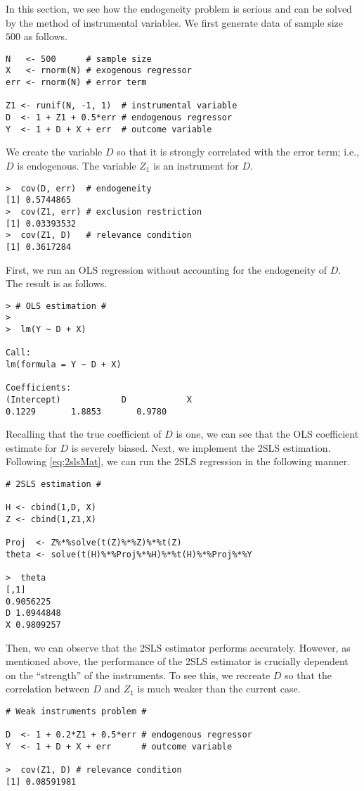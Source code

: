 \documentclass[11pt, A4paper, openany, uplatex]{book}
\begin{document}
In this section, we see how the endogeneity problem is serious and can be solved by the method of instrumental variables.
We first generate data of sample size $500$ as follows.
\begin{lstlisting}[basicstyle=\ttfamily\footnotesize, frame=single]
N   <- 500      # sample size
X   <- rnorm(N) # exogenous regressor
err <- rnorm(N) # error term

Z1 <- runif(N, -1, 1)  # instrumental variable
D  <- 1 + Z1 + 0.5*err # endogenous regressor
Y  <- 1 + D + X + err  # outcome variable
\end{lstlisting}
We create the variable $D$ so that it is strongly correlated with the error term; i.e., $D$ is endogenous.
The variable $Z_1$ is an instrument for $D$.
\begin{lstlisting}[basicstyle=\ttfamily\footnotesize, frame=single]
>  cov(D, err)  # endogeneity
[1] 0.5744865
>  cov(Z1, err) # exclusion restriction
[1] 0.03393532
>  cov(Z1, D)   # relevance condition
[1] 0.3617284
\end{lstlisting}
First, we run an OLS regression without accounting for the endogeneity of $D$.
The result is as follows.
\begin{lstlisting}[basicstyle=\ttfamily\footnotesize, frame=single]
> # OLS estimation #
> 
>  lm(Y ~ D + X)

Call:
lm(formula = Y ~ D + X)

Coefficients:
(Intercept)            D            X  
0.1229       1.8853       0.9780  
\end{lstlisting}
Recalling that the true coefficient of $D$ is one, we can see that the OLS coefficient estimate for $D$ is severely biased.
Next, we implement the 2SLS estimation.
Following \eqref{eq:2slsMat}, we can run the 2SLS regression in the following manner. 
\begin{lstlisting}[basicstyle=\ttfamily\footnotesize, frame=single]
# 2SLS estimation #

H <- cbind(1,D, X)
Z <- cbind(1,Z1,X)

Proj  <- Z%*%solve(t(Z)%*%Z)%*%t(Z)
theta <- solve(t(H)%*%Proj%*%H)%*%t(H)%*%Proj%*%Y

>  theta
[,1]
0.9056225
D 1.0944848
X 0.9809257
\end{lstlisting}
Then, we can observe that the 2SLS estimator performs accurately.
However, as mentioned above, the performance of the 2SLS estimator is crucially dependent on the ``strength'' of the instruments.
To see this, we recreate $D$ so that the correlation between $D$ and $Z_1$ is much weaker than the current case.
\begin{lstlisting}[basicstyle=\ttfamily\footnotesize, frame=single]
# Weak instruments problem #

D  <- 1 + 0.2*Z1 + 0.5*err # endogenous regressor
Y  <- 1 + D + X + err      # outcome variable

>  cov(Z1, D) # relevance condition
[1] 0.08591981
\end{lstlisting}
\end{document}
